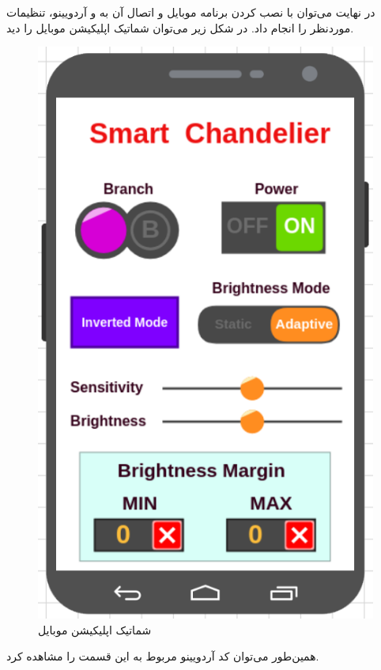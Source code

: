 \documentclass[12pt,a4paper]{article}
\begin{document}
	در نهایت می‌توان با نصب کردن برنامه موبایل و اتصال آن به  و آردویینو، تنظیمات موردنظر را انجام داد.
	\newpage
	در شکل زیر می‌توان شماتیک اپلیکیشن موبایل را دید.
	
	\begin{figure}[H]
		\centering
		\includegraphics[scale=0.5]{figs/shcema-ma.png}
		\caption{
			شماتیک اپلیکیشن موبایل
		}
		\label{fig:schema}
	\end{figure}
	همین‌طور می‌توان کد آردویینو مربوط به این قسمت را مشاهده کرد. 
	
	
\end{document}
